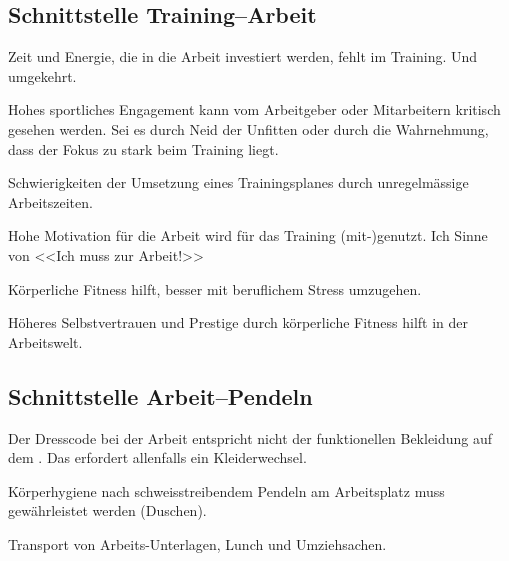 \subsection{Schnittstelle Training--Arbeit}


  \begin{itemize*}
    \item Zeit und Energie, die in die Arbeit investiert werden, fehlt im Training. Und umgekehrt.
    \item Hohes sportliches Engagement kann vom Arbeitgeber oder Mitarbeitern kritisch gesehen werden.
      Sei es durch Neid der Unfitten oder durch die Wahrnehmung, dass der Fokus zu stark beim Training liegt.
    \item Schwierigkeiten der Umsetzung eines Trainingsplanes durch unregelmässige Arbeitszeiten.
  \end{itemize*}


  \begin{itemize*}
    \item Hohe Motivation für die Arbeit wird für das Training (mit-)genutzt.
        Ich Sinne von <<Ich muss zur Arbeit!>>
    \item Körperliche Fitness hilft, besser mit beruflichem Stress umzugehen.
    \item Höheres Selbstvertrauen und Prestige durch körperliche Fitness hilft in der Arbeitswelt.
  \end{itemize*}

\subsection{Schnittstelle Arbeit--Pendeln}


  \begin{itemize*}
    \item Der Dresscode bei der Arbeit entspricht nicht der funktionellen Bekleidung auf dem \rv.
      Das erfordert allenfalls ein Kleiderwechsel.
    \item Körperhygiene nach schweisstreibendem Pendeln am Arbeitsplatz muss gewährleistet werden (Duschen).
    \item Transport von Arbeits-Unterlagen, Lunch und Umziehsachen.
  \end{itemize*}


